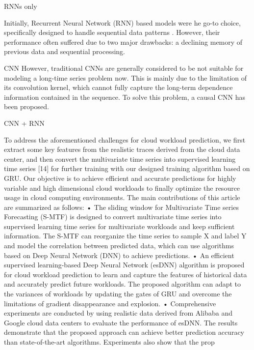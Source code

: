 
RNNs only
\cite{wang2021algorithm}
\cite{bi2021integrated}
\cite{nguyen2019host}

Initially, Recurrent Neural Network (RNN) based models were he go-to choice, specifically designed to handle sequential data patterns . However, their performance often suffered due to two major drawbacks: a declining memory of previous data and sequential processing. 

CNN
\cite{LSTNet} %
\cite{RPTCN}
However, traditional CNNs are generally considered to be
not suitable for modeling a long-time series problem now. This
is mainly due to the limitation of its convolution kernel, which
cannot fully capture the long-term dependence information
contained in the sequence. To solve this problem, a causal
CNN has been proposed.

CNN + RNN
\cite{xu2022esdnn}

To address the aforementioned challenges for cloud workload prediction, we first extract some
key features from the realistic traces derived from the cloud data center, and then convert the multivariate time series into supervised learning time series [14] for further training with our designed
training algorithm based on GRU. Our objective is to achieve efficient and accurate predictions for
highly variable and high dimensional cloud workloads to finally optimize the resource usage in
cloud computing environments.
The main contributions of this article are summarized as follows:
• The sliding window for Multivariate Time series Forecasting (S-MTF) is designed to
convert multivariate time series into supervised learning time series for multivariate workloads and keep sufficient information. The S-MTF can reorganize the time series to sample
X and label Y and model the correlation between predicted data, which can use algorithms
based on Deep Neural Network (DNN) to achieve predictions.
• An efficient supervised learning-based Deep Neural Network (esDNN) algorithm is proposed for cloud workload prediction to learn and capture the features of historical data and
accurately predict future workloads. The proposed algorithm can adapt to the variances of
workloads by updating the gates of GRU and overcome the limitations of gradient disappearance and explosion.
• Comprehensive experiments are conducted by using realistic data derived from Alibaba and
Google cloud data centers to evaluate the performance of esDNN. The results demonstrate
that the proposed approach can achieve better prediction accuracy than state-of-the-art algorithms. Experiments also show that the prop

